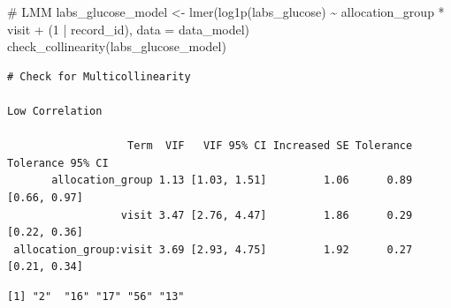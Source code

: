 \documentclass[
  12pt,
]{article}
\newenvironment{Shaded}{\begin{snugshade}}{\end{snugshade}}
\newcommand{\AttributeTok}[1]{\textcolor[rgb]{0.40,0.45,0.13}{#1}}
\newcommand{\CommentTok}[1]{\textcolor[rgb]{0.37,0.37,0.37}{#1}}
\newcommand{\DecValTok}[1]{\textcolor[rgb]{0.68,0.00,0.00}{#1}}
\newcommand{\FunctionTok}[1]{\textcolor[rgb]{0.28,0.35,0.67}{#1}}
\newcommand{\NormalTok}[1]{\textcolor[rgb]{0.00,0.23,0.31}{#1}}
\newcommand{\OtherTok}[1]{\textcolor[rgb]{0.00,0.23,0.31}{#1}}
\newcommand{\SpecialCharTok}[1]{\textcolor[rgb]{0.37,0.37,0.37}{#1}}
\newcommand{\StringTok}[1]{\textcolor[rgb]{0.13,0.47,0.30}{#1}}
\begin{document}
\begin{Shaded}
\begin{Highlighting}[]
\CommentTok{\# LMM}
\NormalTok{labs\_glucose\_model }\OtherTok{\textless{}{-}} \FunctionTok{lmer}\NormalTok{(}\FunctionTok{log1p}\NormalTok{(labs\_glucose) }\SpecialCharTok{\textasciitilde{}}\NormalTok{ allocation\_group }\SpecialCharTok{*}\NormalTok{ visit }\SpecialCharTok{+} 
\NormalTok{(}\DecValTok{1} \SpecialCharTok{|}\NormalTok{ record\_id), }\AttributeTok{data =}\NormalTok{ data\_model)}
\FunctionTok{check\_collinearity}\NormalTok{(labs\_glucose\_model)}
\end{Highlighting}
\end{Shaded}

\begin{verbatim}
# Check for Multicollinearity

Low Correlation

                   Term  VIF   VIF 95% CI Increased SE Tolerance Tolerance 95% CI
       allocation_group 1.13 [1.03, 1.51]         1.06      0.89     [0.66, 0.97]
                  visit 3.47 [2.76, 4.47]         1.86      0.29     [0.22, 0.36]
 allocation_group:visit 3.69 [2.93, 4.75]         1.92      0.27     [0.21, 0.34]
\end{verbatim}

\begin{Shaded}
\end{Shaded}

\begin{verbatim}
[1] "2"  "16" "17" "56" "13"
\end{verbatim}
\end{document}

